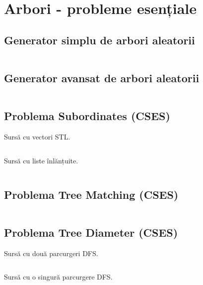 \documentclass[../main.tex]{subfiles}
\begin{document}
\chapter{Arbori - probleme esențiale}

\section{Generator simplu de arbori aleatorii}
\label{code:tree-gen-basic}

\inputminted{cpp}{../src/trees/gen-basic.cpp}

\section{Generator avansat de arbori aleatorii}
\label{code:tree-gen-advanced}

\inputminted{cpp}{../src/trees/gen-advanced.cpp}

\section{Problema Subordinates (CSES)}
\label{code:subordinates}

Sursă cu vectori STL.

\inputminted{cpp}{../src/trees/subordinates-stl.cpp}

Sursă cu liste înlănțuite.

\inputminted{cpp}{../src/trees/subordinates-lists.cpp}

\section{Problema Tree Matching (CSES)}
\label{code:tree-matching}

\inputminted{cpp}{../src/trees/tree-matching.cpp}

\section{Problema Tree Diameter (CSES)}
\label{code:tree-diameter}

Sursă cu două parcurgeri DFS.

\inputminted{cpp}{../src/trees/tree-diameter-two-dfs.cpp}

Sursă cu o singură parcurgere DFS.

\inputminted{cpp}{../src/trees/tree-diameter-single-dfs.cpp}
\end{document}
